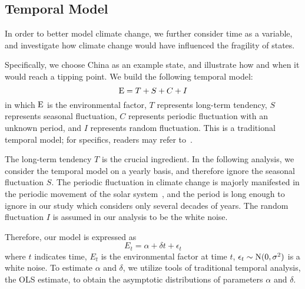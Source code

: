 
\subsection{Temporal Model}
In order to better model climate change, we further consider time as a variable, and investigate how climate change would have influenced the fragility of states. 

Specifically, we choose China as an example state, and illustrate how and when it would reach a tipping point. We build the following temporal model:
\begin{equation}
    \operatorname*{E} = T+S+C+I
   \label{eqn:model:temporal} 
\end{equation}
in which $\operatorname*{E}$ is the environmental factor, $T$ represents long-term tendency, $S$ represents seasonal fluctuation, $C$ represents periodic fluctuation with an unknown period, and $I$ represents random fluctuation. This is a traditional temporal model; for specifics, readers may refer to~.

The long-term tendency $T$ is the crucial ingredient. In the following analysis, we consider the temporal model on a yearly basis, and therefore ignore the seasonal fluctuation $S$. The periodic fluctuation in climate change is majorly manifested in the periodic movement of the solar system~, and the period is long enough to ignore in our study which considers only several decades of years. The random fluctuation $I$ is assumed in our analysis to be the white noise. %

Therefore, our model is expressed as 
\begin{equation}
    E_t = \alpha +\delta t +\epsilon_t
   \label{eqn:model:temporal:tend} 
\end{equation}
where $t$ indicates time, $E_t$ is the environmental factor at time $t$, $\epsilon_t \sim \rm{N}(0,\sigma^2)$ is a white noise. To estimate $\alpha$ and $\delta$, we utilize tools of traditional temporal analysis, the OLS estimate, to obtain the asymptotic distributions of parameters $\alpha$ and $\delta$.

